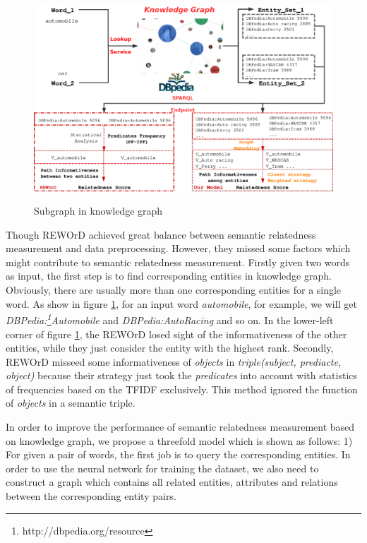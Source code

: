 \begin{figure}
    \flushleft
    \includegraphics[width=1.0\textwidth]{pic/overview.eps}\\
    \caption{Subgraph in knowledge graph}
    \label{overview}
\end{figure}

Though REWOrD\cite{aaai/Pirro12} achieved great balance between
semantic relatedness measurement and data preprocessing.
However, they missed some factors which might contribute to semantic relatedness measurement. 
Firstly given two words as input, the first step is to find corresponding entities in knowledge graph.
Obviously, there are usually more than one corresponding entities for a single word.
As show in figure \ref{overview}, for an input word \emph{automobile}, for example, 
we will get \emph{DBPedia:\footnote{http://dbpedia.org/resource}Automobile} and
\emph{DBPedia:Auto\underline{\hspace{0.5em}}Racing} and so on. In the lower-left corner of figure \ref{overview}, 
the REWOrD losed sight of the informativeness of the other entities, while they just
consider the entity with the highest rank. Secondly, REWOrD misseed
some informativeness of \emph{objects} in \emph{triple(subject, prediacte, object)} because their strategy just
took the \emph{predicates} into account with statistics of frequencies based on the TFIDF exclusively. This
method ignored the function of \emph{objects} in a semantic triple.


In order to improve the performance of semantic relatedness measurement based on knowledge graph, 
we propose a threefold model which is shown as follows:
1) For given a pair of words, the first job is to query the corresponding entities. In order to use the
neural network for training the dataset, we also need to construct a graph which contains all related
entities, attributes and relations between the corresponding entity pairs.

